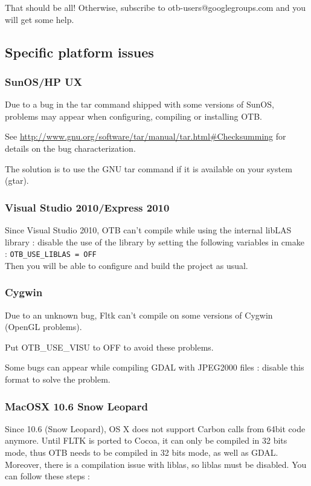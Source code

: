 That should be all! Otherwise, subscribe to
   otb-users@googlegroups.com and you will get some help.

\subsection{Specific platform issues}
\subsubsection{SunOS/HP UX}
Due to a bug in the tar command shipped with some versions of SunOS,
problems may appear when configuring, compiling or installing OTB.

See \url{http://www.gnu.org/software/tar/manual/tar.html#Checksumming} for
details on the bug characterization.

The solution is to use the GNU tar command if it is available on your
system (gtar).

\subsubsection{Visual Studio 2010/Express 2010}
Since Visual Studio 2010, OTB can't compile while using the internal libLAS library : disable the use of the library by setting 
the following variables in cmake :  \texttt{OTB\_USE\_LIBLAS = OFF}\\
Then you will be able to configure and build the project as usual.

\subsubsection{Cygwin}
Due to an unknown bug, Fltk can't compile on some versions of Cygwin (OpenGL problems).

Put OTB\_USE\_VISU to OFF to avoid these problems.

Some bugs can appear while compiling GDAL with JPEG2000 files : disable this format to solve the problem.

\subsubsection{MacOSX 10.6 Snow Leopard}
Since 10.6 (Snow Leopard), OS X does not support Carbon calls from 64bit code anymore. Until FLTK is ported to Cocoa, it can only be compiled in 32 bits mode, thus OTB needs to be compiled in 32 bits mode, as well as GDAL. Moreover, there is a compilation issue with liblas, so liblas must be disabled.
You can follow these steps :

